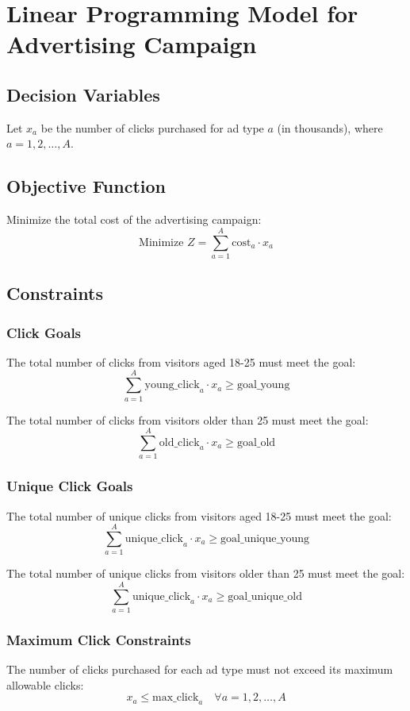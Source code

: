 \documentclass{article}
\begin{document}
\section*{Linear Programming Model for Advertising Campaign}

\subsection*{Decision Variables}
Let \( x_a \) be the number of clicks purchased for ad type \( a \) (in thousands), where \( a = 1, 2, \ldots, A \).

\subsection*{Objective Function}
Minimize the total cost of the advertising campaign:
\[
\text{Minimize } Z = \sum_{a=1}^{A} \text{cost}_a \cdot x_a
\]

\subsection*{Constraints}

\subsubsection*{Click Goals}
The total number of clicks from visitors aged 18-25 must meet the goal:
\[
\sum_{a=1}^{A} \text{young\_click}_{a} \cdot x_a \geq \text{goal\_young}
\]

The total number of clicks from visitors older than 25 must meet the goal:
\[
\sum_{a=1}^{A} \text{old\_click}_{a} \cdot x_a \geq \text{goal\_old}
\]

\subsubsection*{Unique Click Goals}
The total number of unique clicks from visitors aged 18-25 must meet the goal:
\[
\sum_{a=1}^{A} \text{unique\_click}_{a} \cdot x_a \geq \text{goal\_unique\_young}
\]

The total number of unique clicks from visitors older than 25 must meet the goal:
\[
\sum_{a=1}^{A} \text{unique\_click}_{a} \cdot x_a \geq \text{goal\_unique\_old}
\]

\subsubsection*{Maximum Click Constraints}
The number of clicks purchased for each ad type must not exceed its maximum allowable clicks:
\[
x_a \leq \text{max\_click}_{a} \quad \forall a = 1, 2, \ldots, A
\]
\end{document}
